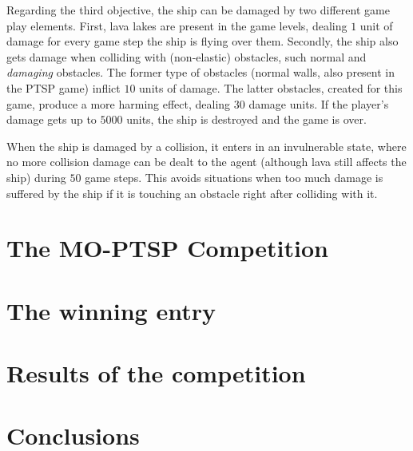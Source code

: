 \documentclass[conference]{IEEEtran}
\begin{document}
Regarding the third objective, the ship can be damaged by two different game play elements. First, lava lakes are present in the game levels, dealing $1$ unit of damage for every game step the ship is flying over them. Secondly, the ship also gets damage when colliding with (non-elastic) obstacles, such normal and \textit{damaging} obstacles. The former type of obstacles (normal walls, also present in the PTSP game) inflict $10$ units of damage. The latter obstacles, created for this game, produce a more harming effect, dealing $30$ damage units. If the player's damage gets up to $5000$ units, the ship is destroyed and the game is over.

When the ship is damaged by a collision, it enters in an invulnerable state, where no more collision damage can be dealt to the agent (although lava still affects the ship) during $50$ game steps. This avoids situations when too much damage is suffered by the ship if it is touching an obstacle right after colliding with it.

\section{The MO-PTSP Competition}


\section{The winning entry}


\section{Results of the competition}


\section{Conclusions}




\end{document}
